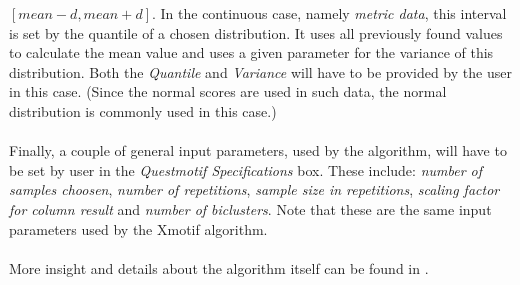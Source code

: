 \documentclass[a4paper]{article}\usepackage[]{graphicx}\usepackage[]{color}
\begin{document}
$[mean-d,mean+d]$. In the continuous case, namely {\it metric data}, this
interval is set by the quantile of a chosen distribution. It uses all previously
found values to calculate the mean value and uses a given parameter for the
variance of this distribution. Both the {\it Quantile} and {\it Variance} will
have to be provided by the user in this case. (Since the normal scores are used
in such data, the normal distribution is commonly used in this case.)
\\ \\
Finally, a couple of general input parameters, used by the algorithm, will have
to be set by user in the {\it Questmotif Specifications} box. These include:
{\it number of samples choosen}, {\it number of repetitions}, {\it sample size
in repetitions}, {\it scaling factor for column result} and {\it number of
biclusters}. Note that these are the same input parameters used by the Xmotif
algorithm.
\\ \\
More insight and details about the algorithm itself can be found in \citet{Kaiser2011}.
\end{document}
